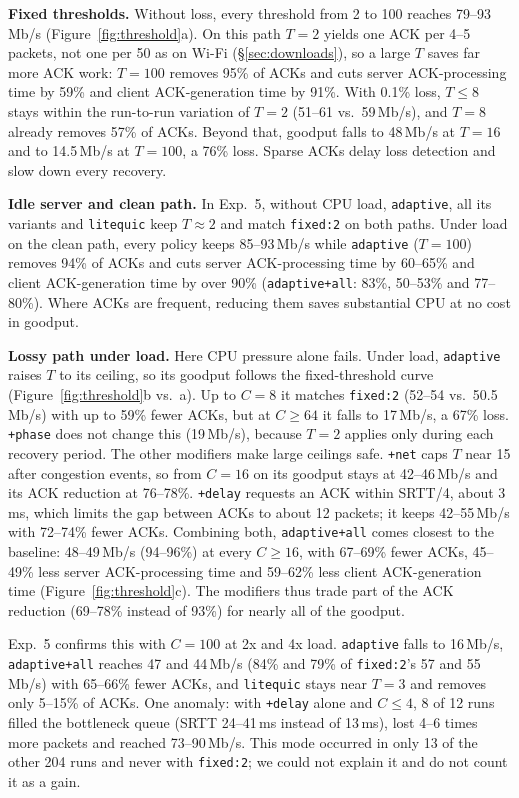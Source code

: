\documentclass[11pt]{article}
\newcommand{\pol}[1]{\texttt{#1}}            %
\newcommand{\para}[1]{\textbf{#1}} %
\newcommand{\ms}{\,ms}
\newcommand{\mbps}{\,Mb/s}
\begin{document}
\para{Fixed thresholds.} Without loss, every threshold from 2 to 100 reaches 79--93\mbps{}
(Figure~\ref{fig:threshold}a). On this path $T{=}2$ yields one ACK per 4--5 packets, not one per
50 as on Wi-Fi (\S\ref{sec:downloads}), so a large $T$ saves far more ACK work: $T{=}100$ removes
95\% of ACKs and cuts server ACK-processing time by 59\% and client ACK-generation time by 91\%.
With 0.1\% loss, $T{\le}8$ stays within the run-to-run variation of $T{=}2$ (51--61 vs.\
59\mbps), and $T{=}8$ already removes 57\% of ACKs. Beyond that, goodput falls to 48\mbps{} at
$T{=}16$ and to 14.5\mbps{} at $T{=}100$, a 76\% loss. Sparse ACKs delay loss detection and slow down every recovery.

\para{Idle server and clean path.} In Exp.~5, without CPU load, \pol{adaptive}, all its variants
and \pol{litequic} keep $T{\approx}2$ and match \pol{fixed:2} on both paths. Under load on the clean
path, every policy keeps 85--93\mbps{} while \pol{adaptive} ($T{=}100$) removes 94\% of ACKs and
cuts server ACK-processing time by 60--65\% and client ACK-generation time by over 90\%
(\pol{adaptive+all}: 83\%, 50--53\% and 77--80\%). Where ACKs are frequent, reducing them saves
substantial CPU at no cost in goodput.

\para{Lossy path under load.} Here CPU pressure alone fails. Under load, \pol{adaptive} raises
$T$ to its ceiling, so its goodput follows the fixed-threshold curve
(Figure~\ref{fig:threshold}b vs.\ a). Up to $C{=}8$ it matches \pol{fixed:2} (52--54 vs.\
50.5\mbps) with up to 59\% fewer ACKs, but at $C{\ge}64$ it falls to 17\mbps, a 67\% loss.
\pol{+phase} does not change this (19\mbps), because $T{=}2$ applies only during each recovery
period. The other modifiers make large ceilings safe. \pol{+net} caps $T$ near 15 after
congestion events, so from $C{=}16$ on its goodput stays at 42--46\mbps{} and its ACK reduction
at 76--78\%. \pol{+delay} requests an ACK within SRTT/4, about 3\ms, which limits the gap between
ACKs to about 12 packets; it keeps 42--55\mbps{} with 72--74\% fewer ACKs. Combining both,
\pol{adaptive+all} comes closest to the baseline: 48--49\mbps{} (94--96\%) at every $C{\ge}16$,
with 67--69\% fewer ACKs, 45--49\% less server ACK-processing time and 59--62\% less client
ACK-generation time (Figure~\ref{fig:threshold}c). The modifiers thus trade part of the ACK
reduction (69--78\% instead of 93\%) for nearly all of the goodput.

Exp.~5 confirms this with $C{=}100$ at 2x and 4x load. \pol{adaptive} falls to 16\mbps,
\pol{adaptive+all} reaches 47 and 44\mbps{} (84\% and 79\% of \pol{fixed:2}'s 57 and 55\mbps)
with 65--66\% fewer ACKs, and \pol{litequic} stays near $T{=}3$ and removes only 5--15\% of
ACKs. One anomaly: with \pol{+delay} alone and $C{\le}4$, 8 of 12 runs filled the bottleneck queue
(SRTT 24--41\ms{} instead of 13\ms), lost 4--6 times more packets and reached 73--90\mbps. This
mode occurred in only 13 of the other 204 runs and never with \pol{fixed:2}; we could not explain
it and do not count it as a gain.
\end{document}

